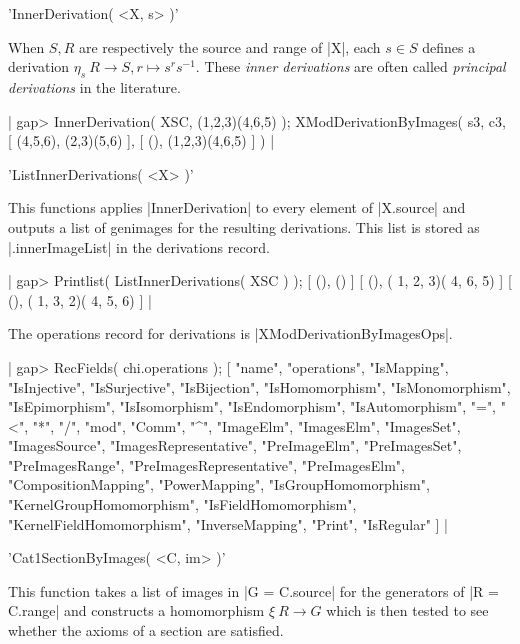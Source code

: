 'InnerDerivation( <X, s> )'

When $S,R$ are respectively the source and range of |X|, each
$s \in S$  defines a derivation  
$\eta_s \: R \to S, r \mapsto s^r s^{-1}$.
These {\em inner derivations} are often called 
{\em principal derivations} in the literature.

|    gap> InnerDerivation( XSC, (1,2,3)(4,6,5) );
    XModDerivationByImages( s3, c3, [ (4,5,6), (2,3)(5,6) ],
       [ (), (1,2,3)(4,6,5) ] )  |

%

'ListInnerDerivations( <X> )'
 
This functions applies |InnerDerivation| to every element of |X.source|
and outputs a list of genimages for the resulting derivations.
This list is stored as |.innerImageList| in the derivations record.

|    gap> Printlist( ListInnerDerivations( XSC ) );
    [ (), () ]
    [ (), ( 1, 2, 3)( 4, 6, 5) ]
    [ (), ( 1, 3, 2)( 4, 5, 6) ]  |

%

The operations record for derivations is  |XModDerivationByImagesOps|.

|    gap> RecFields( chi.operations );
    [ "name", "operations", "IsMapping", "IsInjective", "IsSurjective", 
      "IsBijection", "IsHomomorphism", "IsMonomorphism", "IsEpimorphism", 
      "IsIsomorphism", "IsEndomorphism", "IsAutomorphism", "=", "<", "*",
      "/", "mod", "Comm", "^", "ImageElm", "ImagesElm", "ImagesSet",
      "ImagesSource", "ImagesRepresentative", "PreImageElm",
      "PreImagesSet", "PreImagesRange", "PreImagesRepresentative",
      "PreImagesElm", "CompositionMapping", "PowerMapping",
      "IsGroupHomomorphism", "KernelGroupHomomorphism",
      "IsFieldHomomorphism", "KernelFieldHomomorphism",
      "InverseMapping", "Print", "IsRegular" ]  |

%

'Cat1SectionByImages( <C, im> )'

This function takes a list of images in |G = C.source|  for the generators
of  |R = C.range| and constructs a homomorphism  $\xi \: R \to G$
which is then tested to see whether the axioms of a section are satisfied.

